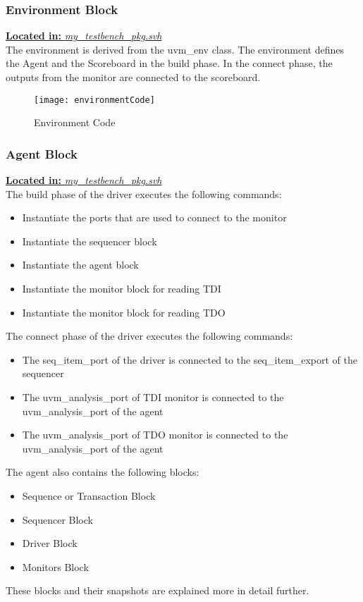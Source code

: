 \documentclass[a4paper,11pt]{article}
\begin{document}
\FloatBarrier
\subsubsection{Environment Block}
\underline{\textbf{Located in:} \textit{my\_testbench\_pkg.svh}}\\

The environment is derived from the uvm\_env class. The environment defines the Agent and the Scoreboard in the build phase. In the connect phase, the outputs from the monitor are connected to the scoreboard.

\begin{figure}[ht]
\centering
\texttt{[image: environmentCode]}
\caption{Environment Code}
\end{figure}

\FloatBarrier
\subsubsection{Agent Block}

\underline{\textbf{Located in:} \textit{my\_testbench\_pkg.svh}}\\

The build phase of the driver executes the following commands:
\begin{itemize}[noitemsep]
\item Instantiate the ports that are used to connect to the monitor
\item Instantiate the sequencer block
\item Instantiate the agent block
\item Instantiate the monitor block for reading TDI 
\item Instantiate the monitor block for reading TDO
\end{itemize}

The connect phase of the driver executes the following commands:
\begin{itemize}[noitemsep]
\item The seq\_item\_port of the driver is connected to the seq\_item\_export of the sequencer
\item The uvm\_analysis\_port of TDI monitor is connected to the uvm\_analysis\_port of the agent
\item The uvm\_analysis\_port of TDO monitor is connected to the uvm\_analysis\_port of the agent
\end{itemize}

The agent also contains the following blocks:
\begin{itemize}[noitemsep]
\item Sequence or Transaction Block
\item Sequencer Block
\item Driver Block
\item Monitors Block
\end{itemize}
These blocks and their snapshots are explained more in detail further.
\end{document}
